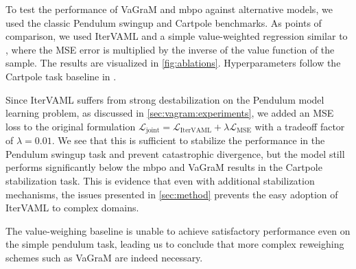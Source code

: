 To test the performance of VaGraM and \ac{mbpo} against alternative models, we used the classic Pendulum swingup and Cartpole benchmarks.
As points of comparison, we used IterVAML \parencite{itervaml} and a simple value-weighted regression similar to \textcite{nair2020goal}, where the MSE error is multiplied by the inverse of the value function of the sample. The results are visualized in \autoref{fig:ablations}.
Hyperparameters follow the Cartpole task baseline in \textcite{pineda2021mbrl}.

Since IterVAML suffers from strong destabilization on the Pendulum model learning problem, as discussed in \autoref{sec:vagram:experiments}, we added an MSE loss to the original formulation $\mathcal{L}_\text{joint} = \mathcal{L}_\text{IterVAML} + \lambda \mathcal{L}_\text{MSE}$ with a tradeoff factor of $\lambda = 0.01$.
We see that this is sufficient to stabilize the performance in the Pendulum swingup task and prevent catastrophic divergence, but the model still performs significantly below the \ac{mbpo} and VaGraM results in the Cartpole stabilization task.
This is evidence that even with additional stabilization mechanisms, the issues presented in \autoref{sec:method} prevents the easy adoption of IterVAML to complex domains.

The value-weighing baseline is unable to achieve satisfactory performance even on the simple pendulum task, leading us to conclude that more complex reweighing schemes such as VaGraM are indeed necessary.


